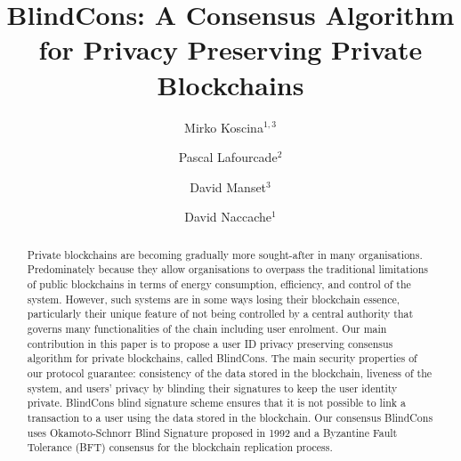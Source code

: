\documentclass[conference]{llncs}
\newcommand{\name}{BlindCons}
\begin{document}
\title{\name{}: A Consensus Algorithm for Privacy Preserving Private Blockchains\\}

\author{Mirko Koscina$^{1,3}$ \and Pascal Lafourcade$^2$ \and David Manset$^3$ \and David Naccache$^1$}

\maketitle


\begin{abstract}
Private blockchains are becoming gradually more sought-after in many organisations. Predominately because they allow organisations to overpass the traditional limitations of public blockchains in terms of energy consumption, efficiency, and control of the system. However, such systems are in some ways losing their blockchain essence, particularly their unique feature of not being controlled by a central authority that governs many functionalities of the chain including user enrolment. Our main contribution in this paper is to propose a user ID privacy preserving consensus algorithm for private blockchains, called \name{}. The main security properties of our protocol guarantee: consistency of the data stored in the blockchain, liveness of the system, and users' privacy by blinding their signatures to keep the user identity private. \name{} blind signature scheme ensures that it is not possible to link a transaction to a user using the data stored in the blockchain. Our consensus BlindCons uses Okamoto-Schnorr Blind Signature proposed in 1992 and a Byzantine Fault Tolerance (BFT) consensus for the blockchain replication process.
\end{abstract}

\end{document}
